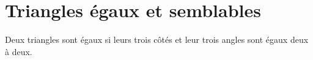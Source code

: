 %	
%	 



\section{Triangles égaux et semblables}

\begin{definition}
	Deux triangles sont égaux si leurs trois côtés et leur trois angles sont égaux deux à deux. 
\end{definition} 
